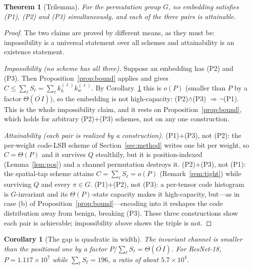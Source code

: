 \documentclass[a4paper,fleqn]{cas-dc}
\theoremstyle{plain}
\newtheorem{theorem}{Theorem}
\newtheorem{corollary}{Corollary}
\theoremstyle{remark}
\begin{document}
\begin{theorem}[Trilemma]\label{thm:tri}
For the permutation group $G$, no embedding satisfies \textup{(P1)}, \textup{(P2)} and
\textup{(P3)} simultaneously, and each of the three pairs is attainable.
\end{theorem}
\begin{proof}
The two claims are proved by different means, as they must be: impossibility is a universal
statement over all schemes and attainability is an existence statement.

\emph{Impossibility (no scheme has all three).} Suppose an embedding has \textup{(P2)} and
\textup{(P3)}. Then Proposition~\ref{prop:bound} applies and gives
$C\le\sum_\ell S_\ell=\sum_\ell k_h^{(\ell)}k_w^{(\ell)}$. By Corollary~\ref{cor:gap} this is
$o(P)$ (smaller than $P$ by a factor $\Theta(\overline{O\,I})$), so the embedding is not
high-capacity: \textup{(P2)}$\wedge$\textup{(P3)} $\Rightarrow\neg$\textup{(P1)}. This is the
whole impossibility claim, and it rests on Proposition~\ref{prop:bound}, which holds for
arbitrary \textup{(P2)}+\textup{(P3)} schemes, not on any one construction.

\emph{Attainability (each pair is realized by a construction).} \textup{(P1)}+\textup{(P3)},
not \textup{(P2)}: the per-weight code-LSB scheme of Section~\ref{sec:method} writes one bit
per weight, so $C=\Theta(P)$ and it survives $Q$ stealthily, but it is position-indexed
(Lemma~\ref{lem:pos}) and a channel permutation destroys it. \textup{(P2)}+\textup{(P3)}, not
\textup{(P1)}: the spatial-tap scheme attains $C=\sum_\ell S_\ell=o(P)$ (Remark~\ref{rem:tight})
while surviving $Q$ and every $\pi\in G$. \textup{(P1)}+\textup{(P2)}, not \textup{(P3)}: a
per-tensor code histogram is $G$-invariant and its $\Theta(P)$-state capacity makes it
high-capacity, but---as in case (b) of Proposition~\ref{prop:bound}---encoding into it reshapes
the code distribution away from benign, breaking \textup{(P3)}. These three constructions show
each pair is achievable; impossibility above shows the triple is not.
\end{proof}

\begin{corollary}[The gap is quadratic in width]\label{cor:gap}
The invariant channel is smaller than the positional one by a factor
$P/\sum_\ell S_\ell=\Theta(\overline{O\,I})$. For ResNet-18, $P=1.117\times10^{7}$ while
$\sum_\ell S_\ell=196$, a ratio of about $5.7\times10^{4}$.
\end{corollary}
\end{document}
